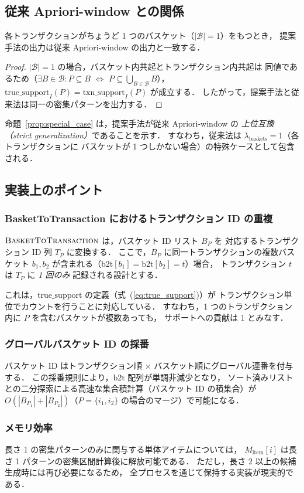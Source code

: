 \subsection{従来 Apriori-window との関係}
\label{sec:relationship}

\begin{proposition}[特殊ケースとしての従来法]
\label{prop:special_case}
各トランザクションがちょうど 1 つのバスケット（$|\mathcal{B}| = 1$）をもつとき，
提案手法の出力は従来 Apriori-window の出力と一致する．
\end{proposition}

\begin{proof}
$|\mathcal{B}| = 1$ の場合，バスケット内共起とトランザクション内共起は
同値であるため（$\exists B \in \mathcal{B}: P \subseteq B$
$\Leftrightarrow$ $P \subseteq \bigcup_{B \in \mathcal{B}} B$），
$\text{true\_support}_I(P) = \text{txn\_support}_I(P)$ が成立する．
したがって，提案手法と従来法は同一の密集パターンを出力する．
\end{proof}

命題~\ref{prop:special_case} は，提案手法が従来 Apriori-window の
\emph{上位互換（strict generalization）}であることを示す．
すなわち，従来法は $\lambda_{\text{baskets}} = 1$（各トランザクションに
バスケットが 1 つしかない場合）の特殊ケースとして包含される．

\subsection{実装上のポイント}

\subsubsection{BasketToTransaction におけるトランザクション ID の重複}
$\Call{BasketToTransaction}{}$ は，バスケット ID リスト $B_P$ を
対応するトランザクション ID 列 $T_P$ に変換する．
ここで，$B_P$ に同一トランザクションの複数バスケット
$b_1, b_2$ が含まれる（$\text{b2t}[b_1] = \text{b2t}[b_2] = t$）場合，
トランザクション $t$ は $T_P$ に \emph{1 回のみ} 記録される設計とする．

これは，$\text{true\_support}$ の定義（式~(\ref{eq:true_support})）が
トランザクション単位でカウントを行うことに対応している．
すなわち，1 つのトランザクション内に $P$ を含むバスケットが複数あっても，
サポートへの貢献は 1 とみなす．

\subsubsection{グローバルバスケット ID の採番}
バスケット ID はトランザクション順 × バスケット順にグローバル連番を付与する．
この採番規則により，$\text{b2t}$ 配列が単調非減少となり，
ソート済みリストとの二分探索による高速な集合積計算（バスケット ID の積集合）が
$O(|B_{P_1}| + |B_{P_2}|)$（$P = \{i_1, i_2\}$ の場合のマージ）で可能になる．

\subsubsection{メモリ効率}
長さ 1 の密集パターンのみに関与する単体アイテムについては，
$M_{\text{item}}[i]$ は長さ 1 パターンの密集区間計算後に解放可能である．
ただし，長さ 2 以上の候補生成時には再び必要になるため，
全プロセスを通じて保持する実装が現実的である．
